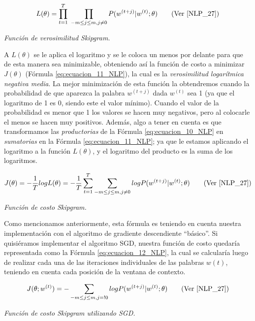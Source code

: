 \documentclass[12pt,a4paper]{article}
\begin{document}
\begin{sloppypar}
\begin{equation}\label{eq:ecuacion_10_NLP}
L(\theta) = \prod_{t=1}^{T} \; \prod_{-m \leq j \leq m, j \neq 0}  P(w^{(t+j)} | w^{(t)} ; \theta) \qquad \text{(Ver \cite{NLP_27})}
\end{equation} 
\begin{center}
\textit{Función de verosimilitud Skipgram.}
\end{center}

A  $L(\theta)$  se le aplica el logaritmo y se le coloca un menos por delante para que de esta manera sea minimizable, obteniendo así la función de costo a minimizar $J(\theta)$ (Fórmula \ref{eq:ecuacion_11_NLP}), la cual es la \textit{verosimilitud logarítmica negativa media}. La mejor minimización de esta función la obtendremos cuando la probabilidad de que aparezca la palabra $w^{(t+j)}$ dada $w^{(t)}$ sea 1 (ya que el logaritmo de 1 es 0, siendo este el valor mínimo). Cuando el valor de la probabilidad es menor que 1 los valores se hacen muy negativos, pero al colocarle el menos se hacen muy positivos. Además, algo a tener en cuenta es que transformamos las \textit{productorias} de la Fórmula \ref{eq:ecuacion_10_NLP} en \textit{sumatorias} en la Fórmula \ref{eq:ecuacion_11_NLP}; ya que le estamos aplicando el logaritmo a la función $L(\theta)$, y el logaritmo del producto es la suma de los logaritmos.
\cleardoublepage

\begin{equation}\label{eq:ecuacion_11_NLP}
J(\theta) = -\frac{1}{T} log L (\theta) = -\frac{1}{T} \sum_{t=1}^{T} \sum_{-m \leq j \leq m, j \neq 0} log P(w^{(t+j)} | w^{(t)} ; \theta)    \qquad \text{(Ver \cite{NLP_27})}
\end{equation}
\begin{center}
\textit{Función de costo Skipgram.}
\end{center}

Como mencionamos anteriormente, esta fórmula es teniendo en cuenta nuestra implementación con el algoritmo de gradiente descendiente “básico”. Si quisiéramos implementar el algoritmo SGD, nuestra función de costo quedaría representada como la Fórmula \ref{eq:ecuacion_12_NLP}, la cual se calcularía luego de realizar cada una de las iteraciones individuales de las palabras $w(t)$, teniendo en cuenta cada posición de la ventana de contexto. 

\begin{equation}\label{eq:ecuacion_12_NLP}
J (\theta;w^{(t)}) = - \sum_{-m \leq j \leq m, j =! 0} log P(w^{(t+j)} | w^{(t)} ; \theta)   \qquad \text{(Ver \cite{NLP_27})}
\end{equation}
\begin{center}
\textit{Función de costo Skipgram utilizando SGD.}
\end{center}


\end{sloppypar}
\end{document}
